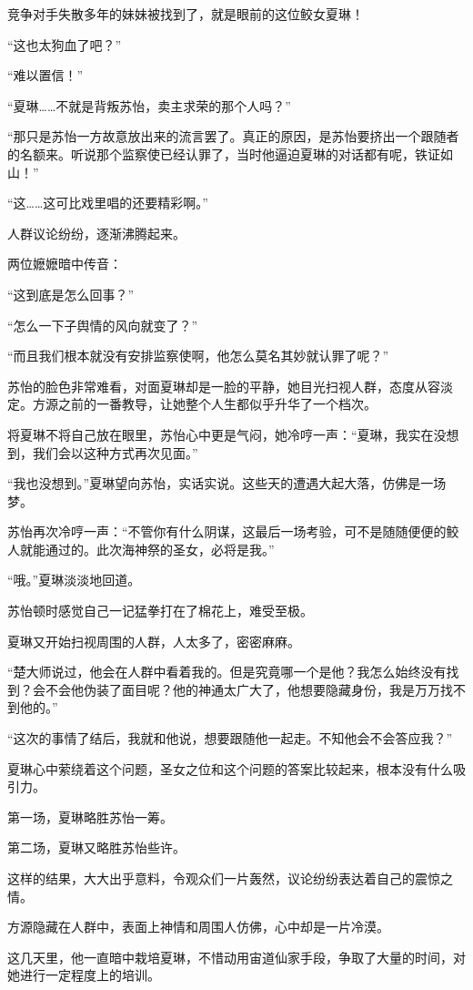 \begin{this_body}
竞争对手失散多年的妹妹被找到了，就是眼前的这位鲛女夏琳！

“这也太狗血了吧？”

“难以置信！”

“夏琳……不就是背叛苏怡，卖主求荣的那个人吗？”

“那只是苏怡一方故意放出来的流言罢了。真正的原因，是苏怡要挤出一个跟随者的名额来。听说那个监察使已经认罪了，当时他逼迫夏琳的对话都有呢，铁证如山！”

“这……这可比戏里唱的还要精彩啊。”

人群议论纷纷，逐渐沸腾起来。

两位嬷嬷暗中传音：

“这到底是怎么回事？”

“怎么一下子舆情的风向就变了？”

“而且我们根本就没有安排监察使啊，他怎么莫名其妙就认罪了呢？”

苏怡的脸色非常难看，对面夏琳却是一脸的平静，她目光扫视人群，态度从容淡定。方源之前的一番教导，让她整个人生都似乎升华了一个档次。

将夏琳不将自己放在眼里，苏怡心中更是气闷，她冷哼一声：“夏琳，我实在没想到，我们会以这种方式再次见面。”

“我也没想到。”夏琳望向苏怡，实话实说。这些天的遭遇大起大落，仿佛是一场梦。

苏怡再次冷哼一声：“不管你有什么阴谋，这最后一场考验，可不是随随便便的鲛人就能通过的。此次海神祭的圣女，必将是我。”

“哦。”夏琳淡淡地回道。

苏怡顿时感觉自己一记猛拳打在了棉花上，难受至极。

夏琳又开始扫视周围的人群，人太多了，密密麻麻。

“楚大师说过，他会在人群中看着我的。但是究竟哪一个是他？我怎么始终没有找到？会不会他伪装了面目呢？他的神通太广大了，他想要隐藏身份，我是万万找不到他的。”

“这次的事情了结后，我就和他说，想要跟随他一起走。不知他会不会答应我？”

夏琳心中萦绕着这个问题，圣女之位和这个问题的答案比较起来，根本没有什么吸引力。

第一场，夏琳略胜苏怡一筹。

第二场，夏琳又略胜苏怡些许。

这样的结果，大大出乎意料，令观众们一片轰然，议论纷纷表达着自己的震惊之情。

方源隐藏在人群中，表面上神情和周围人仿佛，心中却是一片冷漠。

这几天里，他一直暗中栽培夏琳，不惜动用宙道仙家手段，争取了大量的时间，对她进行一定程度上的培训。


\end{this_body}
